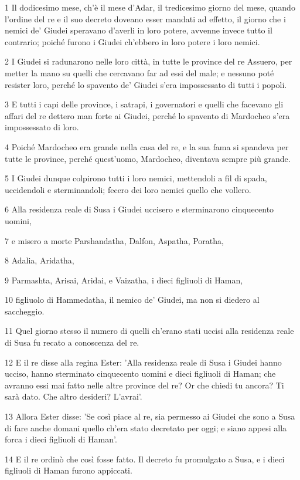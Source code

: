 \par 1 Il dodicesimo mese, ch'è il mese d'Adar, il tredicesimo giorno del mese, quando l'ordine del re e il suo decreto doveano esser mandati ad effetto, il giorno che i nemici de' Giudei speravano d'averli in loro potere, avvenne invece tutto il contrario; poiché furono i Giudei ch'ebbero in loro potere i loro nemici.
\par 2 I Giudei si radunarono nelle loro città, in tutte le province del re Assuero, per metter la mano su quelli che cercavano far ad essi del male; e nessuno poté resister loro, perché lo spavento de' Giudei s'era impossessato di tutti i popoli.
\par 3 E tutti i capi delle province, i satrapi, i governatori e quelli che facevano gli affari del re dettero man forte ai Giudei, perché lo spavento di Mardocheo s'era impossessato di loro.
\par 4 Poiché Mardocheo era grande nella casa del re, e la sua fama si spandeva per tutte le province, perché quest'uomo, Mardocheo, diventava sempre più grande.
\par 5 I Giudei dunque colpirono tutti i loro nemici, mettendoli a fil di spada, uccidendoli e sterminandoli; fecero dei loro nemici quello che vollero.
\par 6 Alla residenza reale di Susa i Giudei uccisero e sterminarono cinquecento uomini,
\par 7 e misero a morte Parshandatha, Dalfon, Aspatha, Poratha,
\par 8 Adalia, Aridatha,
\par 9 Parmashta, Arisai, Aridai, e Vaizatha, i dieci figliuoli di Haman,
\par 10 figliuolo di Hammedatha, il nemico de' Giudei, ma non si diedero al saccheggio.
\par 11 Quel giorno stesso il numero di quelli ch'erano stati uccisi alla residenza reale di Susa fu recato a conoscenza del re.
\par 12 E il re disse alla regina Ester: 'Alla residenza reale di Susa i Giudei hanno ucciso, hanno sterminato cinquecento uomini e dieci figliuoli di Haman; che avranno essi mai fatto nelle altre province del re? Or che chiedi tu ancora? Ti sarà dato. Che altro desideri? L'avrai'.
\par 13 Allora Ester disse: 'Se così piace al re, sia permesso ai Giudei che sono a Susa di fare anche domani quello ch'era stato decretato per oggi; e siano appesi alla forca i dieci figliuoli di Haman'.
\par 14 E il re ordinò che così fosse fatto. Il decreto fu promulgato a Susa, e i dieci figliuoli di Haman furono appiccati.
